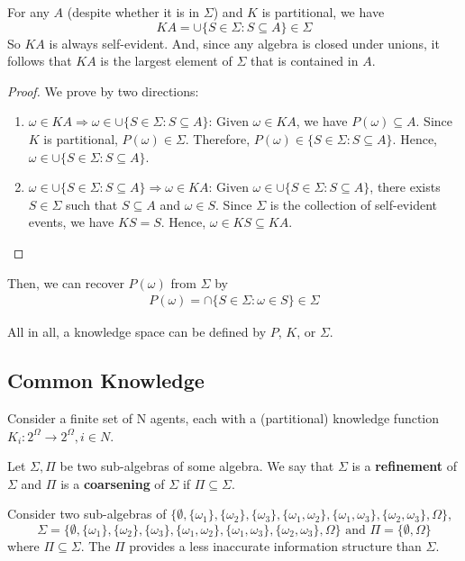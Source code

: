 \documentclass[11pt]{elegantbook}
\begin{document}
\begin{corollary}[$KA\in\Sigma$]
    For any $A$ (despite whether it is in $\Sigma$) and $K$ is partitional, we have $$KA = \cup\{S \in \Sigma : S \subseteq A\} \in \Sigma$$
    So $KA$ is always self-evident. And, since any algebra is closed under unions, it follows that $KA$ is the largest element of $\Sigma$ that is contained in $A$.
\end{corollary}
\begin{proof}
    We prove by two directions:
    \begin{enumerate}[(1).]
        \item \underline{$\omega\in KA \Rightarrow \omega\in\cup\{S \in \Sigma : S \subseteq A\}$}: Given $\omega\in KA$, we have $P(\omega)\subseteq A$. Since $K$ is partitional, $P(\omega)\in\Sigma$. Therefore, $P(\omega)\in\{S \in \Sigma : S \subseteq A\}$. Hence, $\omega\in \cup\{S \in \Sigma : S \subseteq A\}$.
        \item \underline{$\omega\in\cup\{S \in \Sigma : S \subseteq A\} \Rightarrow \omega\in KA$}: Given $\omega\in\cup\{S \in \Sigma : S \subseteq A\}$, there exists $S\in\Sigma$ such that $S \subseteq A$ and $\omega\in S$. Since $\Sigma$ is the collection of self-evident events, we have $KS=S$. Hence, $\omega\in KS\subseteq KA$.
    \end{enumerate}
\end{proof}
Then, we can recover $P(\omega)$ from $\Sigma$ by
\begin{equation}
    \begin{aligned}
        P(\omega)=\cap\{S\in\Sigma:\omega\in S\}\in\Sigma
    \end{aligned}
    \nonumber
\end{equation}

All in all, a knowledge space can be defined by $P$, $K$, or $\Sigma$.

\subsection{Common Knowledge}
Consider a finite set of N agents, each with a (partitional) knowledge function $K_i:2^\Omega \rightarrow 2^\Omega, i\in N$.

\begin{definition}
    \normalfont
    Let $\Sigma, \Pi$ be two sub-algebras of some algebra. We say that $\Sigma$ is a \textbf{refinement} of $\Sigma$ and $\Pi$ is a \textbf{coarsening} of $\Sigma$ if $\Pi \subseteq \Sigma$.
\end{definition}
\begin{example}
    Consider two sub-algebras of $\{\emptyset,\{\omega_1\},\{\omega_2\},\{\omega_3\},\{\omega_1,\omega_2\},\{\omega_1,\omega_3\},\{\omega_2,\omega_3\},\Omega\}$, $$\Sigma=\{\emptyset,\{\omega_1\},\{\omega_2\},\{\omega_3\},\{\omega_1,\omega_2\},\{\omega_1,\omega_3\},\{\omega_2,\omega_3\},\Omega\}\text{ and }\Pi=\{\emptyset,\Omega\}$$
    where $\Pi\subseteq \Sigma$. The $\Pi$ provides a less inaccurate information structure than $\Sigma$.
\end{example}
\end{document}
